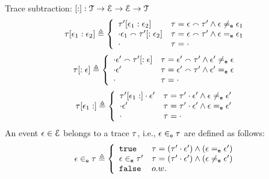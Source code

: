%
Trace subtraction: $[ : ] : \mathcal{{T} \to \mathcal{E} \to \mathcal{E} \to \mathcal{T}}$
\[
  \trace[\event_1 : \event_2] \triangleq
  \left\{
  \begin{array}{ll} 
  \trace'[\event_1: \event_2]             & \trace = \event \tracecat \trace' \land \event \eventneq \event_1 \\
  \cdot {} \event_1 \tracecat \trace'[:\event_2]  & \trace = \event \tracecat \trace' \land \event \eventeq \event_1 \\
  \cdot {} & \trace = \cdot \\
  \end{array}
  \right.
\]
\[
  \trace[:\event] \triangleq
  \left\{
  \begin{array}{ll} 
  \cdot {} \event' \tracecat \trace'[: \event]             & \trace = \event' \tracecat \trace' \land \event' \eventneq \event \\
  \cdot {} \event'  & \trace = \event' \tracecat \trace' \land \event' \eventeq \event \\
  \cdot  & \trace = \cdot \\
  \end{array}
  \right.
\]
\[
  \trace[\event_1 : ] \triangleq
  \left\{
  \begin{array}{ll} 
  \trace'[\event_1: ] \cdot \event'     & \trace = \trace'\cdot \event' \land \event \eventneq \event' \\
  \cdot {}\event'  & \trace = \trace' \cdot \event' \land \event \eventeq \event' \\
  \cdot  & \trace = \cdot
  \end{array}
  \right.
\]
%
An event $\mathtt{\epsilon} \in \mathcal{E}$ belongs to a trace $\mathtt{\tau}$, i.e., $\mathtt{\epsilon} \in_{\mathtt{e}} \mathtt{\tau}$ are defined as follows:
%
\begin{equation}
  \event \eventin \trace  
  \triangleq \left\{
  \begin{array}{ll} 
    \etrue                  & \trace =  (\trace' \cdot \event') \land (\event \eventeq \event')
                              \\
    \event \eventin \trace' & \trace =  (\trace' \cdot \event') \land (\event \eventneq \event') \\ 
    \efalse                 & o.w.
  \end{array}
  \right.
\end{equation}
%
